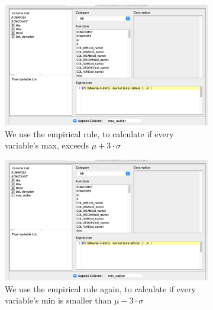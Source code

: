 \documentclass[11pt]{article}
\begin{document}
				\begin{figure}[H]
					\centering
					\begin{subfigure}{0.4\textwidth}
						\includegraphics[width=\textwidth]{res/t0/t03/t03-math-formula-max-outliers-conf}
						\caption{We use the empirical rule, to calculate if every variable's max, exceeds $\mu + 3\cdot\sigma$}
						\label{fig:first}
					\end{subfigure}
					\hfill
					\begin{subfigure}{0.4\textwidth}
						\includegraphics[width=\textwidth]{res/t0/t03/t03-math-formula-min-outliers-conf}
						\caption{We use the empirical rule again, to calculate if every variable's min is smaller than $\mu - 3\cdot\sigma$}
						\label{fig:second}
					\end{subfigure}
					\hfill
					\begin{subfigure}{0.4\textwidth}

\end{subfigure}
\end{figure}
\end{document}
